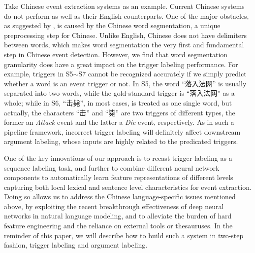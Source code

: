 Take Chinese event extraction systems as an example. Current Chinese systems do not perform as well as their English counterparts. One of the major obstacles, as suggested by , is caused by the Chinese word segmentation, a unique preprocessing step for Chinese. Unlike English, Chinese does not have delimiters between words, which makes word segmentation the very first and fundamental step in Chinese event detection. However, we find that word segmentation granularity does have a great impact on the trigger labeling performance. For example, triggers in S5$\sim$S7 cannot be recognized accurately if we simply predict whether a word is an event trigger or not. In S5, the word ``落入法网'' is usually separated into two words, while the gold-standard trigger is ``落入法网'' as a whole; while in S6, ``击毙'', in most cases, is treated as one single word, but actually, the characters ``击'' and ``毙'' are two triggers of different types, the former an \textit{Attack} event and the latter a \textit{Die} event, respectively. As in such a pipeline framework, incorrect trigger labeling will definitely affect downstream argument labeling, whose inputs are highly related to the predicated triggers.

One of the key innovations of our approach is to recast trigger labeling as a sequence labeling task, and further to combine different neural network components to automatically learn feature representations of different levels capturing both local lexical and sentence level characteristics for event extraction. Doing so allows us to  address the Chinese language-specific issues mentioned above, by exploiting the recent breakthrough effectiveness of deep neural networks in natural language modeling, and to alleviate the burden of hard feature engineering and the reliance on external tools or thesauruses. In the reminder of this paper, we will describe how to build such a system in two-step fashion, trigger labeling and argument labeling. 

